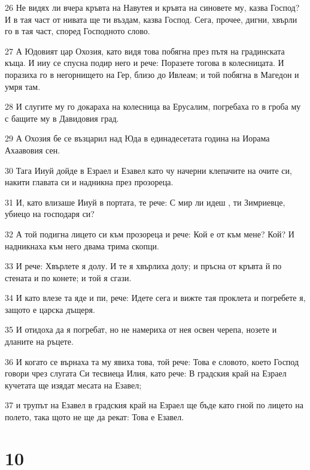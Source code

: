 \par 26 Не видях ли вчера кръвта на Навутея и кръвта на синовете му, казва Господ? И в тая част от нивата ще ти въздам, казва Господ. Сега, прочее, дигни, хвърли го в тая част, според Господното слово.
\par 27 А Юдовият цар Охозия, като видя това побягна през пътя на градинската къща. И ииу се спусна подир него и рече: Поразете тогова в колесницата. И поразиха го в негорнището на Гер, близо до Ивлеам; и той побягна в Магедон и умря там.
\par 28 И слугите му го докараха на колесница ва Ерусалим, погребаха го в гроба му с бащите му в Давидовия град.
\par 29 А Охозия бе се възцарил над Юда в единадесетата година на Иорама Ахаавовия сен.
\par 30 Тага Ииуй дойде в Езраел и Езавел като чу начерни клепачите на очите си, накити главата си и надникна през прозореца.
\par 31 И, като влизаше Ииуй в портата, те рече: С мир ли идеш , ти Зимриевце, убиецо на господаря си?
\par 32 А той подигна лицето си към прозореца и рече: Кой е от към мене? Кой? И надникнаха към него двама трима скопци.
\par 33 И рече: Хвърлете я долу. И те я хвърлиха долу; и пръсна от кръвта й по стената и по конете; и той я сгази.
\par 34 И като влезе та яде и пи, рече: Идете сега и вижте тая проклета и погребете я, защото е царска дъщеря.
\par 35 И отидоха да я погребат, но не намериха от нея освен черепа, нозете и дланите на ръцете.
\par 36 И когато се върнаха та му явиха това, той рече: Това е словото, което Господ говори чрез слугата Си тесвиеца Илия, като рече: В градския край на Езраел кучетата ще изядат месата на Езавел;
\par 37 и трупът на Езавел в градския край на Езраел ще бъде като гной по лицето на полето, така щото не ще да рекат: Това е Езавел.

\chapter{10}

